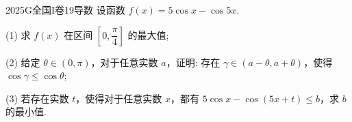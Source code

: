 
\begin{problem}{2025}{G}{全国I卷}{19}{导数}
设函数 $f(x)=5\cos x - \cos 5x$.

(1) 求 $f(x)$ 在区间 $\left[0, \dfrac{\pi}{4}\right]$ 的最大值;

(2) 给定 $\theta \in (0, \pi)$，对于任意实数 $a$，证明: 存在 $\gamma \in (a-\theta, a+\theta)$，使得 $\cos \gamma \leqslant \cos \theta$;

(3) 若存在实数 $t$，使得对于任意实数 $x$，都有 $5\cos x - \cos(5x+t) \leqslant b$，求 $b$ 的最小值.
\end{problem}